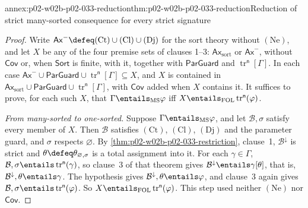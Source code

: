 \begin{annexitem}{annex:p02-w02b-p02-033-reduction}{thm:p02-w02b-p02-033-reduction}{Reduction of strict many-sorted consequence for every strict signature}
\begin{proof}
Write \(\mathsf{Ax}^{-}\defeq(\mathrm{Ct})\cup(\mathrm{Cl})\cup(\mathrm{Dj})\)
for the sort theory without \((\mathrm{Ne})\), and let \(X\) be any of the
four premise sets of clauses 1--3: \(\mathsf{Ax}_{\mathrm{sort}}\) or
\(\mathsf{Ax}^{-}\), without \(\mathsf{Cov}\) or, when \(\mathsf{Sort}\) is
finite, with it, together with \(\mathsf{ParGuard}\) and
\(\operatorname{tr}^{\mathsf n}[\Gamma]\).  In each case
\(\mathsf{Ax}^{-}\cup\mathsf{ParGuard}\cup
\operatorname{tr}^{\mathsf n}[\Gamma]\subseteq X\), and \(X\) is contained in
\(\mathsf{Ax}_{\mathrm{sort}}\cup\mathsf{ParGuard}\cup
\operatorname{tr}^{\mathsf n}[\Gamma]\), with \(\mathsf{Cov}\) added when
\(X\) contains it.  It suffices to prove, for each such \(X\), that
\(\Gamma\entails_{\mathrm{MS}}\varphi\) iff
\(X\entails_{\mathrm{FOL}}\operatorname{tr}^{\mathsf n}(\varphi)\).

\emph{From many-sorted to one-sorted.}  Suppose
\(\Gamma\entails_{\mathrm{MS}}\varphi\), and let \(\mathcal B,\sigma\) satisfy
every member of \(X\).  Then \(\mathcal B\) satisfies \((\mathrm{Ct})\),
\((\mathrm{Cl})\), \((\mathrm{Dj})\) and the parameter guard, and \(\sigma\)
respects \(\varnothing\).  By \cref{thm:p02-w02b-p02-033-restriction}, clause~1,
\(\mathcal B^{\downarrow}\) is strict and
\(\theta\defeq\theta_{\varnothing,\sigma}\) is a total assignment into it.
For each \(\gamma\in\Gamma\), \(\mathcal B,\sigma\entails
\operatorname{tr}^{\mathsf n}(\gamma)\), so clause~3 of that theorem gives
\(\mathcal B^{\downarrow}\entails\gamma[\theta]\), that is,
\(\mathcal B^{\downarrow},\theta\entails\gamma\).  The hypothesis gives
\(\mathcal B^{\downarrow},\theta\entails\varphi\), and clause~3 again gives
\(\mathcal B,\sigma\entails\operatorname{tr}^{\mathsf n}(\varphi)\).  So
\(X\entails_{\mathrm{FOL}}\operatorname{tr}^{\mathsf n}(\varphi)\).  This
step used neither \((\mathrm{Ne})\) nor \(\mathsf{Cov}\).


\end{proof}
\end{annexitem}
